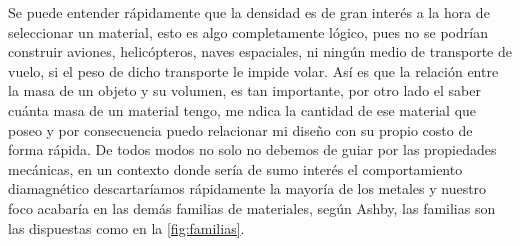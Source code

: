 \documentclass[12pt,a4paper]{article}
\begin{document}
Se puede entender rápidamente que la densidad es de gran interés a la hora de seleccionar un material, esto es algo completamente lógico, pues no se podrían construir aviones, helicópteros,  naves espaciales, ni ningún medio de transporte de vuelo, si el peso de dicho transporte le impide volar. Así es que la relación entre la masa de un objeto y su volumen, es tan importante, por otro lado el saber cuánta masa de un material tengo, me ndica la cantidad de ese material que poseo y por consecuencia puedo relacionar mi diseño con su propio costo de forma rápida.
De todos modos no solo no debemos de guiar por las propiedades mecánicas, en un contexto donde sería de sumo interés el comportamiento diamagnético descartaríamos rápidamente la mayoría de los metales y nuestro foco acabaría en las demás familias de materiales, según Ashby, las familias son las dispuestas como en la \autoref{fig:familias}.
\end{document}
